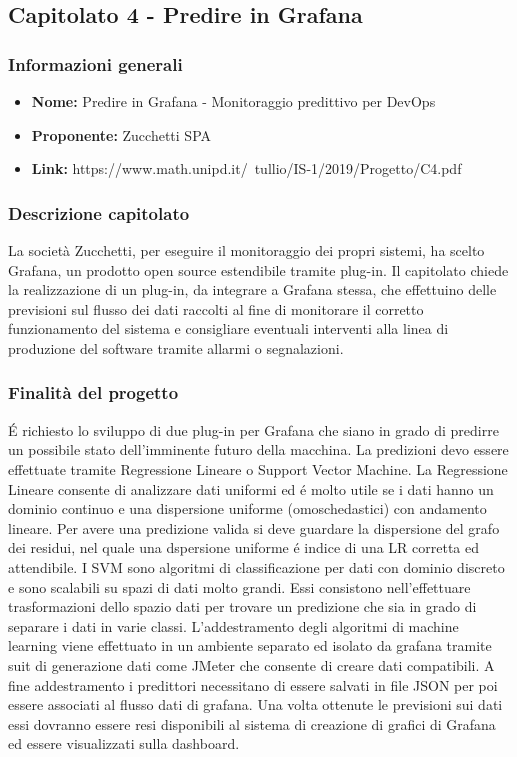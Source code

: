
\subsection{Capitolato 4 - Predire in Grafana}

		\subsubsection{Informazioni generali}
			\begin{itemize} %
			  \item \textbf{Nome:} Predire in Grafana - Monitoraggio predittivo per DevOps
			  \item \textbf{Proponente:} Zucchetti SPA
			  \item \textbf{Link:} https://www.math.unipd.it/~tullio/IS-1/2019/Progetto/C4.pdf
			\end{itemize}

		\subsubsection{Descrizione capitolato}
			La società Zucchetti, per eseguire il monitoraggio dei propri sistemi, ha scelto Grafana, un prodotto open source estendibile tramite plug-in.
			Il capitolato chiede la realizzazione di un plug-in, da integrare a Grafana stessa, che effettuino delle previsioni sul flusso dei dati raccolti al fine di monitorare il corretto funzionamento del sistema e consigliare eventuali interventi alla linea di produzione del software tramite allarmi o segnalazioni.

		\subsubsection{Finalità del progetto}
			É richiesto lo sviluppo di due plug-in per Grafana che siano in grado di predirre un possibile stato dell'imminente futuro della macchina. La predizioni devo essere effettuate tramite Regressione Lineare o Support Vector Machine.
			La Regressione Lineare consente di analizzare dati uniformi ed é molto utile se i dati hanno un dominio continuo e una dispersione uniforme (omoschedastici) con andamento lineare. Per avere una predizione valida si deve guardare la dispersione del grafo dei residui, nel quale una dspersione uniforme é indice di una LR corretta ed attendibile.
			I SVM sono algoritmi di classificazione per dati con dominio discreto e sono scalabili su spazi di dati molto grandi. Essi consistono nell'effettuare trasformazioni dello spazio dati per trovare un predizione che sia in grado di separare i dati in varie classi.
			L'addestramento degli algoritmi di machine learning viene effettuato in un ambiente separato ed isolato da grafana tramite suit di generazione dati come JMeter che consente di creare dati compatibili. A fine addestramento i predittori necessitano di essere salvati in file JSON per poi essere associati al flusso dati di grafana. Una volta ottenute le previsioni sui dati essi dovranno essere resi disponibili al sistema di creazione di grafici di Grafana ed essere visualizzati sulla dashboard.

